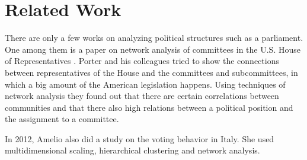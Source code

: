 \chapter{Related Work}
\label{chap:relatedwork}

There are only a few works on analyzing political structures such as a parliament. One among them is a paper on network analysis of committees in the U.S. House of Representatives \cite{Porter_2005}. Porter and his colleagues tried to show the connections between representatives of the House and the committees and subcommittees, in which a big amount of the American legislation happens. Using techniques of network analysis they found out that there are certain correlations between communities and that there also high relations between a political position and the assignment to a committee. 

In 2012, Amelio \cite{Amelio_2012} also did a study on the voting behavior in Italy. She used multidimensional scaling, hierarchical clustering and network analysis.

\cite{Lucioni_2015}




